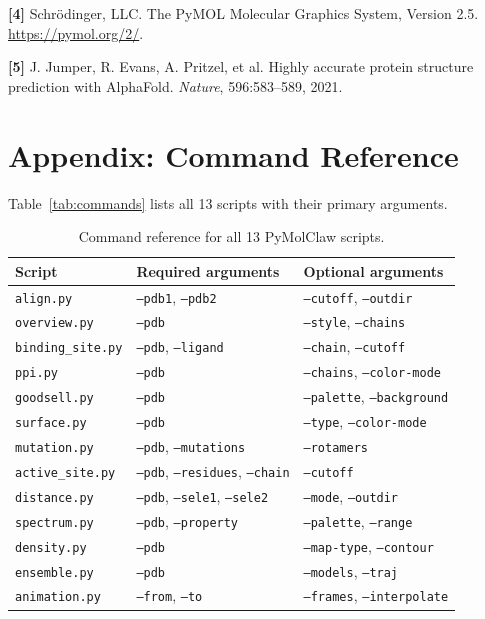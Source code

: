 \documentclass[12pt,a4paper]{article}
\begin{document}
\medskip\noindent\textbf{[4]} Schr\"odinger, LLC. The PyMOL Molecular Graphics System, Version 2.5. \url{https://pymol.org/2/}.

\medskip\noindent\textbf{[5]} J. Jumper, R. Evans, A. Pritzel, et al. Highly accurate protein structure prediction with AlphaFold. \emph{Nature}, 596:583--589, 2021.

\section*{Appendix: Command Reference}

Table~\ref{tab:commands} lists all 13 scripts with their primary arguments.

\begin{longtable}{lll}
\caption{Command reference for all 13 PyMolClaw scripts.}\\
\toprule
Script & Required arguments & Optional arguments \\
\midrule
\endhead
\texttt{align.py}       & \texttt{--pdb1}, \texttt{--pdb2} & \texttt{--cutoff}, \texttt{--outdir} \\
\texttt{overview.py}    & \texttt{--pdb}                    & \texttt{--style}, \texttt{--chains} \\
\texttt{binding\_site.py} & \texttt{--pdb}, \texttt{--ligand} & \texttt{--chain}, \texttt{--cutoff} \\
\texttt{ppi.py}         & \texttt{--pdb}                    & \texttt{--chains}, \texttt{--color-mode} \\
\texttt{goodsell.py}    & \texttt{--pdb}                    & \texttt{--palette}, \texttt{--background} \\
\texttt{surface.py}     & \texttt{--pdb}                    & \texttt{--type}, \texttt{--color-mode} \\
\texttt{mutation.py}    & \texttt{--pdb}, \texttt{--mutations} & \texttt{--rotamers} \\
\texttt{active\_site.py} & \texttt{--pdb}, \texttt{--residues}, \texttt{--chain} & \texttt{--cutoff} \\
\texttt{distance.py}    & \texttt{--pdb}, \texttt{--sele1}, \texttt{--sele2} & \texttt{--mode}, \texttt{--outdir} \\
\texttt{spectrum.py}    & \texttt{--pdb}, \texttt{--property} & \texttt{--palette}, \texttt{--range} \\
\texttt{density.py}     & \texttt{--pdb}                    & \texttt{--map-type}, \texttt{--contour} \\
\texttt{ensemble.py}    & \texttt{--pdb}                    & \texttt{--models}, \texttt{--traj} \\
\texttt{animation.py}   & \texttt{--from}, \texttt{--to}    & \texttt{--frames}, \texttt{--interpolate} \\
\bottomrule
\end{longtable}
\end{document}
